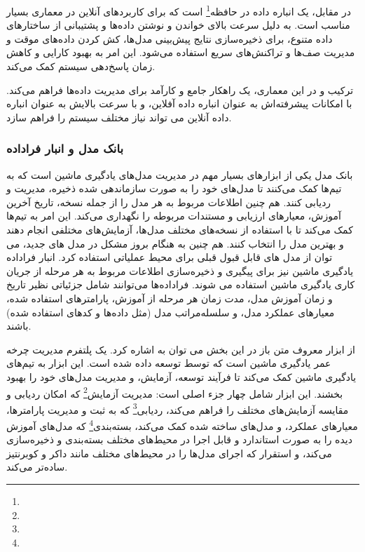 در مقابل،  یک انباره داده در حافظه\footnote{} است که برای کاربردهای آنلاین در معماری  بسیار مناسب است.  به دلیل سرعت بالای خواندن و نوشتن داده‌ها و پشتیبانی از ساختارهای داده متنوع، برای ذخیره‌سازی نتایج پیش‌بینی مدل‌ها، کش کردن داده‌های موقت و مدیریت صف‌ها و تراکنش‌های سریع استفاده می‌شود. این امر به بهبود کارایی و کاهش زمان پاسخ‌دهی سیستم کمک می‌کند.

ترکیب  و  در این معماری، یک راهکار جامع و کارآمد برای مدیریت داده‌ها فراهم می‌کند.  با امکانات پیشرفته‌اش به عنوان انباره داده آفلاین، و  با سرعت بالایش به عنوان انباره داده آنلاین می تواند نیاز مختلف سیستم را فراهم سازد.

\subsubsection{بانک مدل و انبار فراداده}
بانک مدل یکی از ابزارهای بسیار مهم در مدیریت مدل‌های یادگیری ماشین است که به تیم‌ها کمک می‌کنند تا مدل‌های خود را به صورت سازماندهی شده ذخیره، مدیریت و ردیابی کنند. هم چنین اطلاعات مربوط به هر مدل را از جمله نسخه، تاریخ آخرین آموزش، معیارهای ارزیابی و مستندات مربوطه را نگهداری می‌کند. این امر به تیم‌ها کمک می‌کند تا با استفاده از نسخه‌های مختلف مدل‌ها، آزمایش‌های مختلفی انجام دهند و بهترین مدل را انتخاب کنند. هم چنین به هنگام بروز مشکل در مدل های جدید، می توان از مدل های قابل قبول قبلی برای محیط عملیاتی استفاده کرد. انبار فراداده یادگیری ماشین نیز برای پیگیری و ذخیره‌سازی اطلاعات مربوط به هر مرحله از جریان کاری یادگیری ماشین استفاده می شوند. فراداده‌ها می‌توانند شامل جزئیاتی نظیر تاریخ و زمان آموزش مدل، مدت زمان هر مرحله از آموزش، پارامترهای استفاده شده، معیارهای عملکرد مدل، و سلسله‌مراتب مدل (مثل داده‌ها و کدهای استفاده شده) باشند.

از ابزار معروف متن باز در این بخش می توان به  اشاره کرد.  یک پلتفرم مدیریت چرخه عمر یادگیری ماشین است که توسط  توسعه داده شده است. این ابزار به تیم‌های یادگیری ماشین کمک می‌کند تا فرآیند توسعه، آزمایش، و مدیریت مدل‌های خود را بهبود بخشند. این ابزار شامل چهار جزء اصلی است: مدیریت آزمایش\footnote{} که امکان ردیابی و مقایسه آزمایش‌های مختلف را فراهم می‌کند، ردیابی\footnote{} که به ثبت و مدیریت پارامترها، معیارهای عملکرد، و مدل‌های ساخته شده کمک می‌کند، بسته‌بندی\footnote{} که مدل‌های آموزش دیده را به صورت استاندارد و قابل اجرا در محیط‌های مختلف بسته‌بندی و ذخیره‌سازی می‌کند، و استقرار که اجرای مدل‌ها را در محیط‌های مختلف مانند داکر و کوبرنتیز ساده‌تر می‌کند. 

